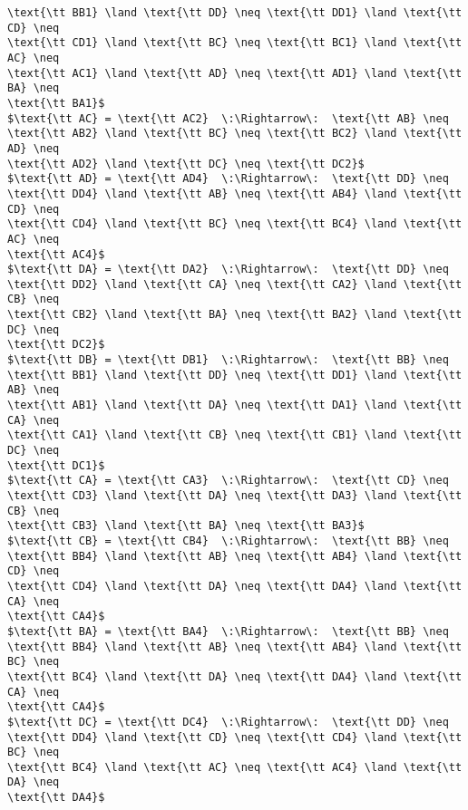 \begin{lstlisting}[mathescape=true, numbers=none, frame=none]
\text{\tt BB1} \land \text{\tt DD} \neq \text{\tt DD1} \land \text{\tt CD} \neq
\text{\tt CD1} \land \text{\tt BC} \neq \text{\tt BC1} \land \text{\tt AC} \neq
\text{\tt AC1} \land \text{\tt AD} \neq \text{\tt AD1} \land \text{\tt BA} \neq
\text{\tt BA1}$
$\text{\tt AC} = \text{\tt AC2}  \:\Rightarrow\:  \text{\tt AB} \neq
\text{\tt AB2} \land \text{\tt BC} \neq \text{\tt BC2} \land \text{\tt AD} \neq
\text{\tt AD2} \land \text{\tt DC} \neq \text{\tt DC2}$
$\text{\tt AD} = \text{\tt AD4}  \:\Rightarrow\:  \text{\tt DD} \neq
\text{\tt DD4} \land \text{\tt AB} \neq \text{\tt AB4} \land \text{\tt CD} \neq
\text{\tt CD4} \land \text{\tt BC} \neq \text{\tt BC4} \land \text{\tt AC} \neq
\text{\tt AC4}$
$\text{\tt DA} = \text{\tt DA2}  \:\Rightarrow\:  \text{\tt DD} \neq
\text{\tt DD2} \land \text{\tt CA} \neq \text{\tt CA2} \land \text{\tt CB} \neq
\text{\tt CB2} \land \text{\tt BA} \neq \text{\tt BA2} \land \text{\tt DC} \neq
\text{\tt DC2}$
$\text{\tt DB} = \text{\tt DB1}  \:\Rightarrow\:  \text{\tt BB} \neq
\text{\tt BB1} \land \text{\tt DD} \neq \text{\tt DD1} \land \text{\tt AB} \neq
\text{\tt AB1} \land \text{\tt DA} \neq \text{\tt DA1} \land \text{\tt CA} \neq
\text{\tt CA1} \land \text{\tt CB} \neq \text{\tt CB1} \land \text{\tt DC} \neq
\text{\tt DC1}$
$\text{\tt CA} = \text{\tt CA3}  \:\Rightarrow\:  \text{\tt CD} \neq
\text{\tt CD3} \land \text{\tt DA} \neq \text{\tt DA3} \land \text{\tt CB} \neq
\text{\tt CB3} \land \text{\tt BA} \neq \text{\tt BA3}$
$\text{\tt CB} = \text{\tt CB4}  \:\Rightarrow\:  \text{\tt BB} \neq
\text{\tt BB4} \land \text{\tt AB} \neq \text{\tt AB4} \land \text{\tt CD} \neq
\text{\tt CD4} \land \text{\tt DA} \neq \text{\tt DA4} \land \text{\tt CA} \neq
\text{\tt CA4}$
$\text{\tt BA} = \text{\tt BA4}  \:\Rightarrow\:  \text{\tt BB} \neq
\text{\tt BB4} \land \text{\tt AB} \neq \text{\tt AB4} \land \text{\tt BC} \neq
\text{\tt BC4} \land \text{\tt DA} \neq \text{\tt DA4} \land \text{\tt CA} \neq
\text{\tt CA4}$
$\text{\tt DC} = \text{\tt DC4}  \:\Rightarrow\:  \text{\tt DD} \neq
\text{\tt DD4} \land \text{\tt CD} \neq \text{\tt CD4} \land \text{\tt BC} \neq
\text{\tt BC4} \land \text{\tt AC} \neq \text{\tt AC4} \land \text{\tt DA} \neq
\text{\tt DA4}$
\end{lstlisting}

